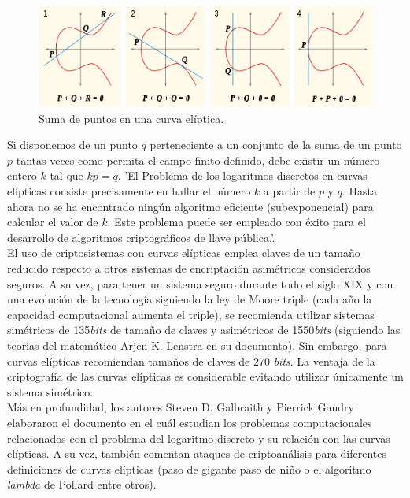 \documentclass[../PFC.tex]{subfiles}
\begin{document}
\begin{figure}[H]
  \centering
  \includegraphics[width=1\textwidth]{./img/ECC}
  \caption{Suma de puntos en una curva elíptica.}
  \label{img:ecc}
\end{figure}

Si disponemos de un punto $q$ perteneciente a un conjunto de la suma de un punto $p$ tantas veces como permita el campo finito definido, debe existir un número entero $k$ tal que $kp = q$. 'El Problema de los logaritmos discretos en curvas elípticas consiste precisamente en hallar el número $k$ a partir de $p$ y $q$. Hasta ahora no se ha encontrado ningún algoritmo eficiente (subexponencial) para calcular el valor de $k$. Este problema puede ser empleado con éxito para el desarrollo de algoritmos criptográficos de llave pública.'\cite{lucena}.
\*
\vspace{0.5515cm}
\\
El uso de criptosistemas con curvas elípticas emplea claves de un tamaño reducido respecto a otros sistemas de encriptación asimétricos considerados seguros. A su vez, para tener un sistema seguro durante todo el siglo XIX y con una evolución de la tecnología siguiendo la ley de Moore triple (cada año la capacidad computacional aumenta el triple), se recomienda utilizar sistemas simétricos de 135\textit{bits} de tamaño de claves y asimétricos de 1550\textit{bits} (siguiendo las teorias del matemático Arjen K. Lenstra en su documento\cite{lenstra}). Sin embargo, para curvas elípticas recomiendan tamaños de claves de 270 \textit{bits}. La ventaja de la criptografía de las curvas elípticas es considerable evitando utilizar únicamente un sistema simétrico\cite{keylength}.
\*
\vspace{0.5515cm}
\\
Más en profundidad, los autores Steven D. Galbraith y Pierrick Gaudry elaboraron el documento \cite{galbraith2016recent} en el cuál estudian los problemas computacionales relacionados con el problema del logaritmo discreto y su relación con las curvas elípticas. A su vez, también comentan ataques de criptoanálisis para diferentes definiciones de curvas elípticas (paso de gigante paso de niño o el algoritmo \textit{lambda} de Pollard entre otros).
\pagebreak
\end{document}
